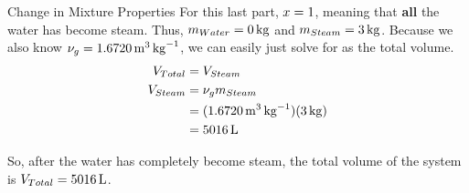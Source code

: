 \begin{example}{Change in Mixture Properties}
  For this last part, $x = 1$, meaning that \textbf{all} the water has become steam.
  Thus, $m_{Water} = \SI{0}{\kilo\gram}$ and $m_{Steam} = \SI{3}{\kilo\gram}$.
  Because we also know $\nu_{g} = \SI{1.6720}{\meter\cubed\per\kilo\gram}$, we can easily just solve for  as the total volume.
  \begin{align*}
    V_{Total} &= V_{Steam} \\
    V_{Steam} &= \nu_{g} m_{Steam} \\
                    &= (\SI{1.6720}{\meter\cubed\per\kilo\gram}) (\SI{3}{\kilo\gram}) \\
                    &= \SI{5016}{\liter}
  \end{align*}

  So, after the water has completely become steam, the total volume of the system is $V_{Total} = \SI{5016}{\liter}$.
\end{example}


